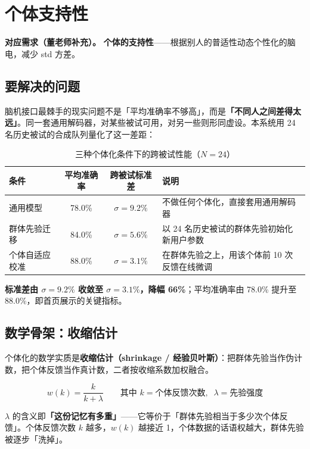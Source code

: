 \documentclass[11pt, a4paper]{ctexart}
\newcommand{\req}[1]{\textcolor{brand}{\sffamily\bfseries #1}}
\begin{document}
\section{个体支持性}

\begin{keybox}
\textbf{对应需求（董老师补充）。} \req{个体的支持性}——根据别人的普适性动态个性化的脑电，减少 std 方差。
\end{keybox}

\subsection{要解决的问题}

脑机接口最棘手的现实问题不是「平均准确率不够高」，而是\textbf{「不同人之间差得太远」}。同一套通用解码器，对某些被试可用，对另一些则形同虚设。本系统用 24 名历史被试的合成队列量化了这一差距：

\begin{table}[htbp]
\centering
\caption{三种个体化条件下的跨被试性能（$N = 24$）}
\begin{tabularx}{\textwidth}{@{}l c c X@{}}
\toprule
\sffamily\bfseries 条件 & \sffamily\bfseries 平均准确率 & \sffamily\bfseries 跨被试标准差 & \sffamily\bfseries 说明 \\
\midrule
通用模型     & 78.0\% & $\sigma = 9.2\%$ & 不做任何个体化，直接套用通用解码器 \\
群体先验迁移 & 84.0\% & $\sigma = 5.6\%$ & 以 24 名历史被试的群体先验初始化新用户参数 \\
个体自适应校准 & 88.0\% & $\sigma = 3.1\%$ & 在群体先验之上，用该个体前 10 次反馈在线微调 \\
\bottomrule
\end{tabularx}
\end{table}

\textbf{标准差由 $\sigma = 9.2\%$ 收敛至 $\sigma = 3.1\%$，降幅 66\%}；平均准确率由 78.0\% 提升至 88.0\%，即首页展示的关键指标。

\subsection{数学骨架：收缩估计}

个体化的数学实质是\textbf{收缩估计（shrinkage / 经验贝叶斯）}：把群体先验当作伪计数，把个体反馈当作真计数，二者按收缩系数加权融合。

\[
w(k) = \frac{k}{k + \lambda}
\qquad\text{其中 } k = \text{个体反馈次数},\;\; \lambda = \text{先验强度}
\]

$\lambda$ 的含义即\textbf{「这份记忆有多重」}——它等价于「群体先验相当于多少次个体反馈」。个体反馈次数 $k$ 越多，$w(k)$ 越接近 1，个体数据的话语权越大，群体先验被逐步「洗掉」。
\end{document}

